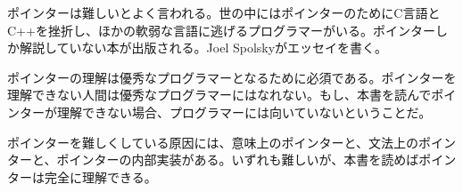 
ポインターは難しいとよく言われる。世の中にはポインターのためにC言語とC++を挫折し、ほかの軟弱な言語に逃げるプログラマーがいる。ポインターしか解説していない本が出版される。Joel Spolskyがエッセイを書く。

ポインターの理解は優秀なプログラマーとなるために必須である。ポインターを理解できない人間は優秀なプログラマーにはなれない。もし、本書を読んでポインターが理解できない場合、プログラマーには向いていないということだ。

ポインターを難しくしている原因には、意味上のポインターと、文法上のポインターと、ポインターの内部実装がある。いずれも難しいが、本書を読めばポインターは完全に理解できる。
